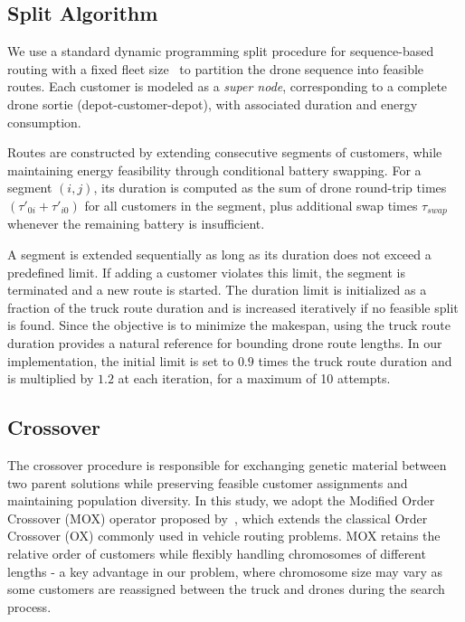 \documentclass[3p, authoryear, 11pt]{elsarticle}
\begin{document}
\subsection{Split Algorithm}

We use a standard dynamic programming split procedure for sequence-based routing with a fixed fleet size~\citep{prins_tour_split_2004, vidal_technical_2016} to partition the drone sequence into feasible routes. Each customer is modeled as a \emph{super node}, corresponding to a complete drone sortie (depot-customer-depot), with associated duration and energy consumption.

Routes are constructed by extending consecutive segments of customers, while maintaining energy feasibility through conditional battery swapping. 
For a segment $(i,j)$, its duration is computed as the sum of drone round-trip times 
$(\tau'_{0i} + \tau'_{i0})$ for all customers in the segment, plus additional swap times $\tau_{swap}$ whenever the remaining battery is insufficient.

A segment is extended sequentially as long as its duration does not exceed a predefined limit. If adding a customer violates this limit, the segment is terminated and a new route is started.
The duration limit is initialized as a fraction of the truck route duration and is increased iteratively if no feasible split is found. Since the objective is to minimize the makespan, using the truck route duration provides a natural reference for bounding drone route lengths. In our implementation, the initial limit is set to $0.9$ times the truck route duration and is multiplied by $1.2$ at each iteration, for a maximum of 10 attempts.

\subsection{Crossover}
The crossover procedure is responsible for exchanging genetic material between two parent solutions while preserving feasible customer assignments and maintaining population diversity.
In this study, we adopt the Modified Order Crossover (MOX) operator proposed by~\cite{pham_solving_2017}, which extends the classical Order Crossover (OX) commonly used in vehicle routing problems.
MOX retains the relative order of customers while flexibly handling chromosomes of different lengths - a key advantage in our problem, where chromosome size may vary as some customers are reassigned between the truck and drones during the search process.
\end{document}
